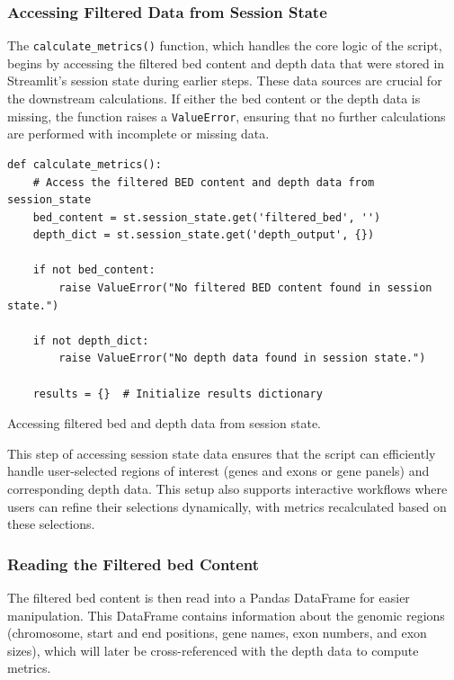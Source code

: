 \subsubsection{\textbf{Accessing Filtered Data from Session State}}

The \texttt{calculate\_metrics()} function, which handles the core logic of the script, begins by accessing the filtered \ac{bed} content and depth data that were stored in Streamlit's session state during earlier steps. These data sources are crucial for the downstream calculations. If either the \ac{bed} content or the depth data is missing, the function raises a \texttt{ValueError}, ensuring that no further calculations are performed with incomplete or missing data.

\begin{longlisting}
\begin{verbatim}
def calculate_metrics():
    # Access the filtered BED content and depth data from session_state
    bed_content = st.session_state.get('filtered_bed', '')
    depth_dict = st.session_state.get('depth_output', {})

    if not bed_content:
        raise ValueError("No filtered BED content found in session state.")

    if not depth_dict:
        raise ValueError("No depth data found in session state.")

    results = {}  # Initialize results dictionary
\end{verbatim}
\caption{Accessing filtered \ac{bed} and depth data from session state.}
\label{lbl:metrics_access}
\end{longlisting}

This step of accessing session state data ensures that the script can efficiently handle user-selected regions of interest (genes and exons or gene panels) and corresponding depth data. This setup also supports interactive workflows where users can refine their selections dynamically, with metrics recalculated based on these selections.

\subsubsection{\textbf{Reading the Filtered \ac{bed} Content}}

The filtered \ac{bed} content is then read into a Pandas DataFrame for easier manipulation. This DataFrame contains information about the genomic regions (chromosome, start and end positions, gene names, exon numbers, and exon sizes), which will later be cross-referenced with the depth data to compute metrics.


